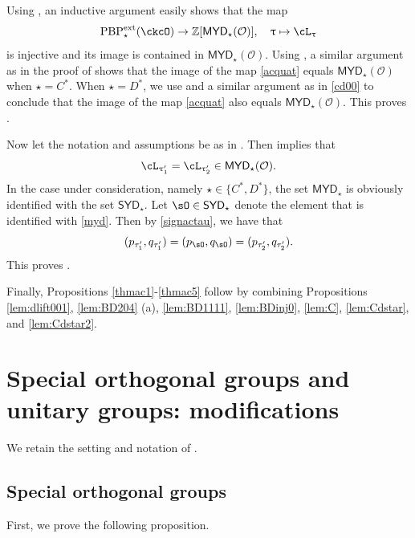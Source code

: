 \documentclass[11pt,a4paper]{amsart}
\def\SYD{{\mathsf{SYD}}}
\def\MYD{{\mathsf{MYD}}}
\newcommand{\CO}{{\mathcal {O}}}
\newcommand{\Z}{\mathbb{Z}}
\newcommand{\be}{\begin {equation}}
\newcommand{\ee}{\end {equation}}
\numberwithin{equation}{section}
\theoremstyle{remark}
\def\PBPes{\mathrm{PBP}^{\mathrm{ext}}_{\star}}
\def\SYD{{\mathsf{SYD}}}
\def\MYD{{\mathsf{MYD}}}
\def\ac{\cL}
\begin{document}
Using , an inductive argument  easily shows that the map
\be\label{acquat}
    \PBPes(\ckcO)\rightarrow \Z[\MYD_\star(\CO)],\quad \uptau\mapsto \ac_\uptau
    \ee
    is injective and its image is contained in  $\MYD_\star(\CO)$.
    Using , a similar argument as in the proof of  shows that the image of the map \eqref{acquat} equals $\MYD_\star(\CO)$ when $\star=C^*$. When $\star=D^*$, we use  and a similar argument as in \eqref{cd00} to conclude that the image of the map \eqref{acquat} also equals $\MYD_\star(\CO)$. This proves .

Now let the notation and assumptions be as in .
Then  implies that
\be\label{myd}
\ac_{\uptau_1'}=\ac_{\uptau_2'}\in \MYD_\star(\CO).
\ee
In the case under consideration, namely $\star\in \{C^*, D^*\}$, the set $\MYD_\star$ is obviously identified with the set $\SYD_\star$. Let $\sO\in \SYD_\star$ denote the element that is identified with \eqref{myd}. Then by \eqref{signactau}, we have that
\[
( p_{\tau'_1}, q_{\tau'_1})=(p_\sO, q_\sO)=( p_{\tau'_2}, q_{\tau'_2}).
\]
 This proves .


 Finally, Propositions \ref{thmac1}-\ref{thmac5} follow by combining Propositions \ref{lem:dlift001}, \ref{lem:BD204} (a), \ref{lem:BD1111}, \ref{lem:BDinj0}, \ref{lem:C},  \ref{lem:Cdstar}, and \ref{lem:Cdstar2}.


\section{Special orthogonal groups and unitary  groups: modifications}\label{modify}

We retain the setting and notation of .

\subsection{Special orthogonal groups}\label{sorth}

First, we prove the following proposition.
\end{document}
